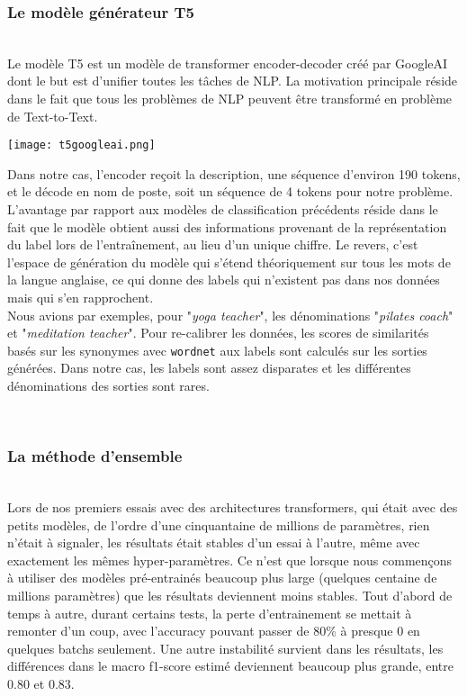 \subsubsection{Le modèle générateur T5}
\hfill\\
Le modèle T5 est un modèle de transformer encoder-decoder créé par GoogleAI dont le but est d'unifier toutes les tâches de NLP. La motivation principale réside dans le fait que tous les problèmes de NLP peuvent être transformé en problème de Text-to-Text.

\texttt{[image: t5googleai.png]}

Dans notre cas, l'encoder reçoit la description, une séquence d'environ 190 tokens, et le décode en nom de poste, soit un séquence de 4 tokens pour notre problème. L'avantage par rapport aux modèles de classification précédents réside dans le fait que le modèle obtient aussi des informations provenant de la représentation du label lors de l'entraînement, au lieu d'un unique chiffre.
Le revers, c'est l'espace de génération du modèle qui s'étend théoriquement sur tous les mots de la langue anglaise, ce qui donne des labels qui n'existent pas dans nos données mais qui s'en rapprochent.\\
Nous avions par exemples, pour "\textit{yoga teacher}", les dénominations "\textit{pilates coach}" et "\textit{meditation teacher}". Pour re-calibrer les données, les scores de similarités basés sur les synonymes avec \texttt{wordnet} aux labels sont calculés sur les sorties générées. Dans notre cas, les labels sont assez disparates et les différentes dénominations des sorties sont rares.

\hfill\\
\subsubsection{La méthode d'ensemble}
\hfill\\

Lors de nos premiers essais avec des architectures transformers, qui était avec des petits modèles, de l'ordre d'une cinquantaine de millions de paramètres, rien n'était à signaler, les résultats était stables d'un essai à l'autre, même avec exactement les mêmes hyper-paramètres. Ce n'est que lorsque nous commençons à utiliser des modèles pré-entrainés beaucoup plus large (quelques centaine de millions paramètres) que les résultats deviennent moins stables. Tout d'abord de temps à autre, durant certains tests, la perte d'entrainement se mettait à remonter d'un coup, avec l'accuracy pouvant passer de 80\% à presque 0 en quelques batchs seulement. Une autre instabilité survient dans les résultats, les différences dans le macro f1-score estimé deviennent beaucoup plus grande, entre 0.80 et 0.83. \\

